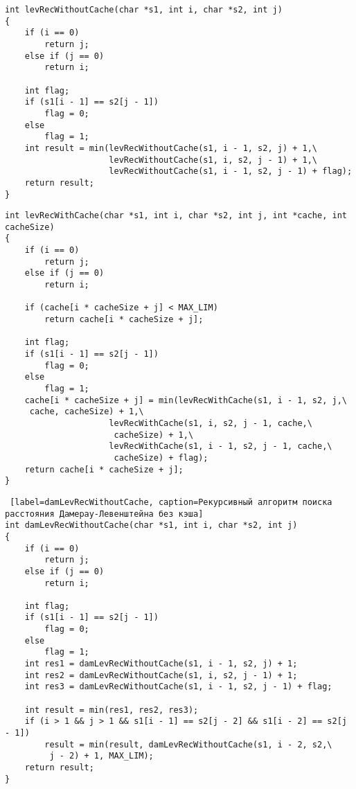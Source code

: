 \begin{lstlisting}[label=damLevRecWithoutCache, caption=Рекурсивный алгоритм поиска расстояния Левенштейна без кэша]
int levRecWithoutCache(char *s1, int i, char *s2, int j)
{
    if (i == 0)
        return j;
    else if (j == 0)
        return i;

    int flag;
    if (s1[i - 1] == s2[j - 1])
        flag = 0;
    else
        flag = 1;
    int result = min(levRecWithoutCache(s1, i - 1, s2, j) + 1,\
                     levRecWithoutCache(s1, i, s2, j - 1) + 1,\
                     levRecWithoutCache(s1, i - 1, s2, j - 1) + flag);
    return result;
}
\end{lstlisting}

\begin{lstlisting}[label=levRecWithCache, caption=Рекурсивный алгоритм поиска расстояния Левенштейна с кэшем в форме матрицы]
int levRecWithCache(char *s1, int i, char *s2, int j, int *cache, int cacheSize)
{
    if (i == 0)
        return j;
    else if (j == 0)
        return i;

    if (cache[i * cacheSize + j] < MAX_LIM)
        return cache[i * cacheSize + j];

    int flag;
    if (s1[i - 1] == s2[j - 1])
        flag = 0;
    else
        flag = 1;
    cache[i * cacheSize + j] = min(levRecWithCache(s1, i - 1, s2, j,\
     cache, cacheSize) + 1,\
                     levRecWithCache(s1, i, s2, j - 1, cache,\
                      cacheSize) + 1,\
                     levRecWithCache(s1, i - 1, s2, j - 1, cache,\
                      cacheSize) + flag);
    return cache[i * cacheSize + j];
}
\end{lstlisting}

\begin{lstlisting} [label=damLevRecWithoutCache, caption=Рекурсивный алгоритм поиска расстояния Дамерау-Левенштейна без кэша]
int damLevRecWithoutCache(char *s1, int i, char *s2, int j)
{
    if (i == 0)
        return j;
    else if (j == 0)
        return i;

    int flag;
    if (s1[i - 1] == s2[j - 1])
        flag = 0;
    else
        flag = 1;
    int res1 = damLevRecWithoutCache(s1, i - 1, s2, j) + 1;
    int res2 = damLevRecWithoutCache(s1, i, s2, j - 1) + 1;
    int res3 = damLevRecWithoutCache(s1, i - 1, s2, j - 1) + flag;

    int result = min(res1, res2, res3);
    if (i > 1 && j > 1 && s1[i - 1] == s2[j - 2] && s1[i - 2] == s2[j - 1])
        result = min(result, damLevRecWithoutCache(s1, i - 2, s2,\
         j - 2) + 1, MAX_LIM);
    return result;
}
\end{lstlisting}

